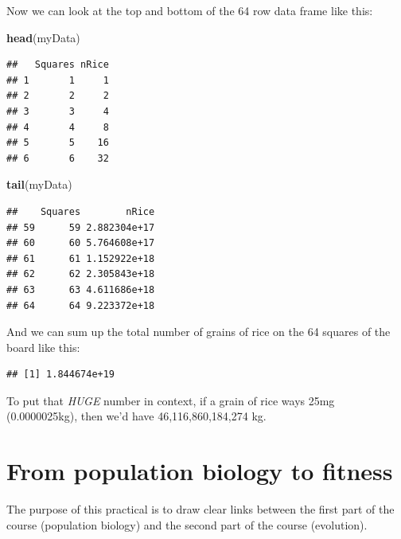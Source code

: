 \documentclass[
  a4paper]{book}
\newenvironment{Shaded}{\begin{snugshade}}{\end{snugshade}}
\newcommand{\FunctionTok}[1]{\textcolor[rgb]{0.13,0.29,0.53}{\textbf{#1}}}
\newcommand{\NormalTok}[1]{#1}
\newcommand{\SpecialCharTok}[1]{\textcolor[rgb]{0.81,0.36,0.00}{\textbf{#1}}}
\begin{document}
Now we can look at the top and bottom of the 64 row data frame like this:

\begin{Shaded}
\begin{Highlighting}[]
\FunctionTok{head}\NormalTok{(myData)}
\end{Highlighting}
\end{Shaded}

\begin{verbatim}
##   Squares nRice
## 1       1     1
## 2       2     2
## 3       3     4
## 4       4     8
## 5       5    16
## 6       6    32
\end{verbatim}

\begin{Shaded}
\begin{Highlighting}[]
\FunctionTok{tail}\NormalTok{(myData)}
\end{Highlighting}
\end{Shaded}

\begin{verbatim}
##    Squares        nRice
## 59      59 2.882304e+17
## 60      60 5.764608e+17
## 61      61 1.152922e+18
## 62      62 2.305843e+18
## 63      63 4.611686e+18
## 64      64 9.223372e+18
\end{verbatim}

And we can sum up the total number of grains of rice on the 64 squares of the board like this:

\begin{Shaded}
\end{Shaded}

\begin{verbatim}
## [1] 1.844674e+19
\end{verbatim}

To put that \emph{HUGE} number in context, if a grain of rice ways 25mg (0.0000025kg), then we'd have 46,116,860,184,274 kg.

\chapter{From population biology to fitness}\label{from-population-biology-to-fitness}

The purpose of this practical is to draw clear links between the first part of the course (population biology) and the second part of the course (evolution).
\end{document}
